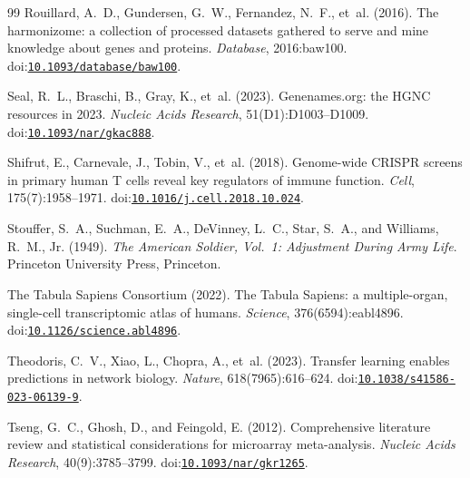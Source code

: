 \begin{thebibliography}{99}
Rouillard, A.~D., Gundersen, G.~W., Fernandez, N.~F., et~al. (2016).
\newblock The harmonizome: a collection of processed datasets gathered to serve and mine knowledge about genes and proteins.
\newblock \emph{Database}, 2016:baw100.
\newblock doi:\href{https://doi.org/10.1093/database/baw100}{\nolinkurl{10.1093/database/baw100}}.

Seal, R.~L., Braschi, B., Gray, K., et~al. (2023).
\newblock Genenames.org: the {HGNC} resources in 2023.
\newblock \emph{Nucleic Acids Research}, 51(D1):D1003--D1009.
\newblock doi:\href{https://doi.org/10.1093/nar/gkac888}{\nolinkurl{10.1093/nar/gkac888}}.

Shifrut, E., Carnevale, J., Tobin, V., et~al. (2018).
\newblock Genome-wide {CRISPR} screens in primary human {T} cells reveal key regulators of immune function.
\newblock \emph{Cell}, 175(7):1958--1971.
\newblock doi:\href{https://doi.org/10.1016/j.cell.2018.10.024}{\nolinkurl{10.1016/j.cell.2018.10.024}}.

Stouffer, S.~A., Suchman, E.~A., DeVinney, L.~C., Star, S.~A., and Williams, R.~M., Jr. (1949).
\newblock \emph{The American Soldier, Vol.~1: Adjustment During Army Life}.
\newblock Princeton University Press, Princeton.

{The Tabula Sapiens Consortium} (2022).
\newblock The {Tabula Sapiens}: a multiple-organ, single-cell transcriptomic atlas of humans.
\newblock \emph{Science}, 376(6594):eabl4896.
\newblock doi:\href{https://doi.org/10.1126/science.abl4896}{\nolinkurl{10.1126/science.abl4896}}.

Theodoris, C.~V., Xiao, L., Chopra, A., et~al. (2023).
\newblock Transfer learning enables predictions in network biology.
\newblock \emph{Nature}, 618(7965):616--624.
\newblock doi:\href{https://doi.org/10.1038/s41586-023-06139-9}{\nolinkurl{10.1038/s41586-023-06139-9}}.

Tseng, G.~C., Ghosh, D., and Feingold, E. (2012).
\newblock Comprehensive literature review and statistical considerations for microarray meta-analysis.
\newblock \emph{Nucleic Acids Research}, 40(9):3785--3799.
\newblock doi:\href{https://doi.org/10.1093/nar/gkr1265}{\nolinkurl{10.1093/nar/gkr1265}}.


\end{thebibliography}

